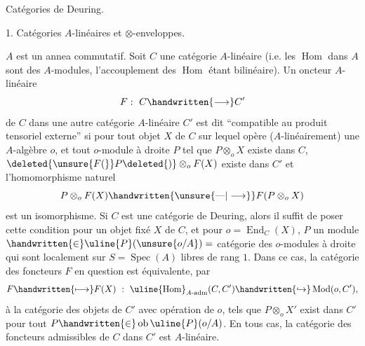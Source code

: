 Catégories de Deuring.

1. Catégories $A$-linéaires et $\otimes$-enveloppes.

$A$ est un annea commutatif. Soit $C$ une catégorie $A$-linéaire (i.e. les $\operatorname{Hom}$ dans $A$ sont des $A$-modules, l'accouplement des $\operatorname{Hom}$ étant bilinéaire). Un oncteur $A$-linéaire
\[
F:\ C\handwritten{\longrightarrow}C'
\]
de $C$ dans une autre catégorie $A$-linéaire $C'$ est dit  ``compatible au produit tensoriel externe'' si pour tout objet $X$ de $C$ sur lequel opère ($A$-linéairement) une $A$-algèbre $o$, et tout $o$-module à droite $P$ tel que $P\otimes_o X$ existe dans $C$, $\deleted{\unsure{F(}}P\deleted{)}\otimes_o F(X)$ existe dans $C'$ et l'homomorphisme naturel
\[
P\otimes_o F(X)\handwritten{\unsure{\text{---}|\longrightarrow}}F(P\otimes_o X)
\]
est un isomorphisme. Si $C$ est une catégorie de Deuring, alors il suffit de poser cette condition pour un objet fixé $X$ de $C$, et pour $o=\operatorname{End}_C(X)$, $P$ un module $\handwritten{\in}\uline{P}(\unsure{o/A})=$ catégorie des $o$-modules à droite qui sont localement sur $S=\operatorname{Spec}(A)$ libres de rang $1$. Dans ce cas, la catégorie des foncteurs $F$ en question est équivalente, par
\[
F\handwritten{\longmapsto}F(X)\ :\ \uline{\operatorname{Hom}}_{A\text{-}\mathrm{adm}}(C,C')\handwritten{\hookrightarrow}\operatorname{Mod}(o,C'),
\]
à la catégorie des objets  de $C'$ avec opération  de $o$, tels que $P\otimes_o X'$ exist dans $C'$ pour tout $P\handwritten{\in}\operatorname{ob}\uline{P}(o/A)$. En tous cas, la catégorie des foncteurs admissibles de $C$ dans $C'$ est $A$-linéaire.

